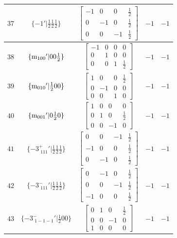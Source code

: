 \documentclass[fleqn,8pt]{jsarticle}
\begin{document}
\begin{longtable}{ccccc}
$ 37 $ & $ \{-1{}'|\frac{1}{2} \frac{1}{2} \frac{1}{2}\} $ & $ \begin{bmatrix} -1 & 0 & 0 & \frac{1}{2} \\ 0 & -1 & 0 & \frac{1}{2} \\ 0 & 0 & -1 & \frac{1}{2} \end{bmatrix} $ & $ -1 $ & $ -1 $ \\ \hline
$ 38 $ & $ \{{\rm m}_{100}{}'|0 0 \frac{1}{2}\} $ & $ \begin{bmatrix} -1 & 0 & 0 & 0 \\ 0 & 1 & 0 & 0 \\ 0 & 0 & 1 & \frac{1}{2} \end{bmatrix} $ & $ -1 $ & $ -1 $ \\ \hline
$ 39 $ & $ \{{\rm m}_{010}{}'|\frac{1}{2} 0 0\} $ & $ \begin{bmatrix} 1 & 0 & 0 & \frac{1}{2} \\ 0 & -1 & 0 & 0 \\ 0 & 0 & 1 & 0 \end{bmatrix} $ & $ -1 $ & $ -1 $ \\ \hline
$ 40 $ & $ \{{\rm m}_{001}{}'|0 \frac{1}{2} 0\} $ & $ \begin{bmatrix} 1 & 0 & 0 & 0 \\ 0 & 1 & 0 & \frac{1}{2} \\ 0 & 0 & -1 & 0 \end{bmatrix} $ & $ -1 $ & $ -1 $ \\ \hline
$ 41 $ & $ \{-3^{+}_{\,\,111}{}'|\frac{1}{2} \frac{1}{2} \frac{1}{2}\} $ & $ \begin{bmatrix} 0 & 0 & -1 & \frac{1}{2} \\ -1 & 0 & 0 & \frac{1}{2} \\ 0 & -1 & 0 & \frac{1}{2} \end{bmatrix} $ & $ -1 $ & $ -1 $ \\ \hline
$ 42 $ & $ \{-3^{-}_{\,\,111}{}'|\frac{1}{2} \frac{1}{2} \frac{1}{2}\} $ & $ \begin{bmatrix} 0 & -1 & 0 & \frac{1}{2} \\ 0 & 0 & -1 & \frac{1}{2} \\ -1 & 0 & 0 & \frac{1}{2} \end{bmatrix} $ & $ -1 $ & $ -1 $ \\ \hline
$ 43 $ & $ \{-3^{-}_{\,\,1-1-1}{}'|\frac{1}{2} 0 0\} $ & $ \begin{bmatrix} 0 & 1 & 0 & \frac{1}{2} \\ 0 & 0 & -1 & 0 \\ 1 & 0 & 0 & 0 \end{bmatrix} $ & $ -1 $ & $ -1 $ \\ \hline

\end{longtable}
\end{document}

